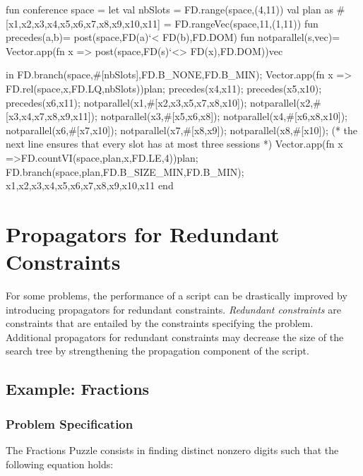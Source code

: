 \documentclass[a4paper]{scrartcl}
\begin{document}
\begin{myverbatim}
fun conference space =
    let 
        val nbSlots = FD.range(space,(4,11)) 
        val plan as 
           #[x1,x2,x3,x4,x5,x6,x7,x8,x9,x10,x11] =
           FD.rangeVec(space,11,(1,11))
        fun precedes(a,b)= post(space,FD(a)`< FD(b),FD.DOM)
        fun notparallel(s,vec)= Vector.app(fn x => 
            post(space,FD(s)`<> FD(x),FD.DOM))vec
        
    in
        FD.branch(space,#[nbSlots],FD.B_NONE,FD.B_MIN);
        Vector.app(fn x => FD.rel(space,x,FD.LQ,nbSlots))plan;
        precedes(x4,x11);
        precedes(x5,x10);
        precedes(x6,x11);
        notparallel(x1,#[x2,x3,x5,x7,x8,x10]);
        notparallel(x2,#[x3,x4,x7,x8,x9,x11]);
        notparallel(x3,#[x5,x6,x8]);
        notparallel(x4,#[x6,x8,x10]);
        notparallel(x6,#[x7,x10]);
        notparallel(x7,#[x8,x9]);
        notparallel(x8,#[x10]);
        (* the next line ensures that every slot has at most 
           three sessions *)
        Vector.app(fn x =>FD.countVI(space,plan,x,FD.LE,4))plan;
        FD.branch(space,plan,FD.B_SIZE_MIN,FD.B_MIN);
        {x1,x2,x3,x4,x5,x6,x7,x8,x9,x10,x11}
    end
\end{myverbatim}


\newpage
\section{Propagators for Redundant Constraints}
\label{redundant}
For some problems, the performance of a script can 
be drastically improved by introducing propagators 
for redundant constraints. {\it Redundant constraints} are 
constraints that are entailed by the constraints specifying 
the problem. Additional propagators for redundant constraints 
may decrease the size of the search tree by strengthening 
the propagation component of the script.

\subsection{Example: Fractions}
\subsubsection{Problem Specification}
The Fractions Puzzle consists in finding 
distinct nonzero digits such that the following 
equation holds:
\end{document}
